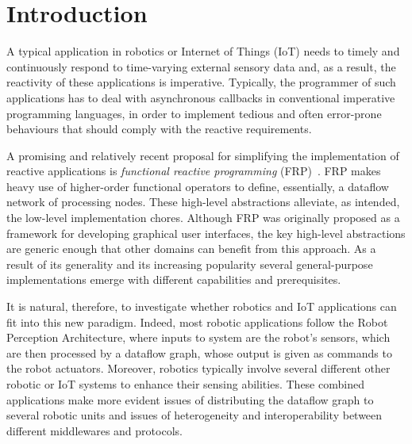 \documentclass[sigplan,screen,10pt]{acmart}
\begin{document}

\maketitle

\section{Introduction} \label{sec:introduction}

A typical application in robotics or Internet of Things (IoT) needs to timely and
continuously respond to time-varying external sensory data and, as a result, the
reactivity of these applications is imperative. Typically, the programmer of such
applications has to deal with asynchronous callbacks in conventional imperative
programming languages, in order to implement tedious and often error-prone behaviours
that should comply with the reactive requirements.

A promising and relatively recent proposal for simplifying the implementation of
reactive applications is \emph{functional reactive programming} (FRP)~\cite{fran}.
FRP makes heavy use of higher-order functional operators to define, essentially, a
dataflow network of processing nodes. These high-level abstractions
alleviate, as intended, the low-level implementation chores. Although FRP was originally
proposed as a framework for developing graphical user interfaces, the key high-level
abstractions are generic enough that other domains can benefit from this
approach. As a result of its generality and its increasing popularity several
general-purpose implementations emerge with different capabilities and prerequisites.

It is natural, therefore, to investigate whether robotics and IoT applications
can fit into this new paradigm. Indeed, most robotic applications follow the
Robot Perception Architecture, where inputs to system are the robot's
sensors, which are then processed by a dataflow graph, whose output is given as
commands to the robot actuators. Moreover, robotics typically involve several
different other robotic or IoT systems to enhance their sensing abilities. These
combined applications make more evident issues of distributing the dataflow graph to
several robotic units and issues of heterogeneity and interoperability between
different middlewares and protocols.
\end{document}
